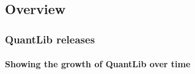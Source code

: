 \documentclass[compress]{beamer}
\begin{document}
\subsection{Overview}
\begin{frame}
  \frametitle{QuantLib releases}
  \framesubtitle{Showing the growth of QuantLib over time}

  \begin{columns}



\end{columns}
\end{frame}
\end{document}
